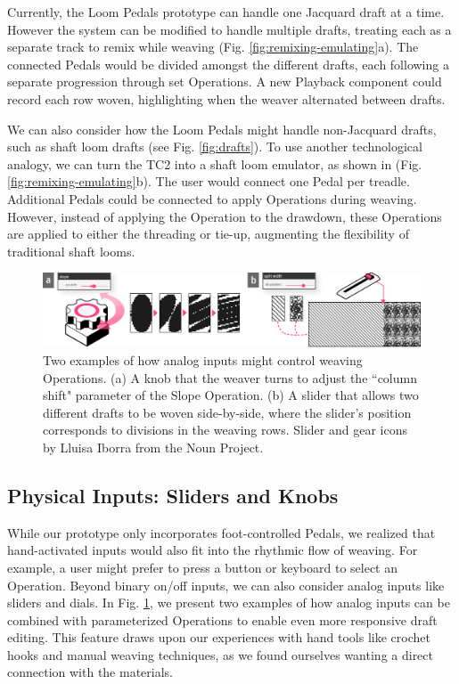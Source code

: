 Currently, the Loom Pedals prototype can handle one Jacquard draft at a time. However the system can be modified to handle multiple drafts, treating each as a separate track to remix while weaving (Fig. \ref{fig:remixing-emulating}a). The connected Pedals would be divided amongst the different drafts, each following a separate progression through set Operations. A new Playback component could record each row woven, highlighting when the weaver alternated between drafts. 

We can also consider how the Loom Pedals might handle non-Jacquard drafts, such as shaft loom drafts (see Fig. \ref{fig:drafts}). To use another technological analogy, we can turn the TC2 into a shaft loom emulator, as shown in (Fig. \ref{fig:remixing-emulating}b). The user would connect one Pedal per treadle. Additional Pedals could be connected to apply Operations during weaving. However, instead of applying the Operation to the drawdown, these Operations are applied to either the threading or tie-up, augmenting the flexibility of traditional shaft looms.

\begin{figure}[t]
    \centering
    \includegraphics[width=\linewidth]{figs/LP_11_sliders.png}
    \caption[Two examples of how analog inputs might control weaving Operations.]{Two examples of how analog inputs might control weaving Operations. (a) A knob that the weaver turns to adjust the ``column shift" parameter of the Slope Operation. (b) A slider that allows two different drafts to be woven side-by-side, where the slider’s position corresponds to divisions in the weaving rows. Slider and gear icons by Lluisa Iborra from the Noun Project.}
    \label{fig:sliders-knobs}
\end{figure}

\subsection{Physical Inputs: Sliders and Knobs}

While our prototype only incorporates foot-controlled Pedals, we realized that hand-activated inputs would also fit into the rhythmic flow of weaving. For example, a user might prefer to press a button or keyboard to select an Operation. Beyond binary on/off inputs, we can also consider analog inputs like sliders and dials. In Fig. \ref{fig:sliders-knobs}, we present two examples of how analog inputs can be combined with parameterized Operations to enable even more responsive draft editing. This feature draws upon our experiences with hand tools like crochet hooks and manual weaving techniques, as we found ourselves wanting a direct connection with the materials. 


